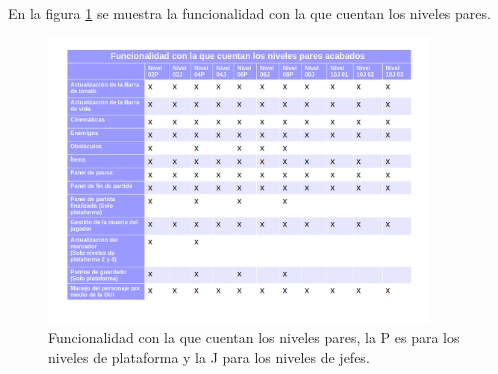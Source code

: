 En la figura \ref{fig:NivelesPares} se muestra la funcionalidad con la que cuentan los niveles pares.
		
		\begin{figure}[h]
    			\centering
    			\includegraphics[width=0.9\textwidth]{04ResultadosObetnidos/imagenes/funcionalidadPares.png}
    			\caption{Funcionalidad con la que cuentan los niveles pares, la P es 
    			para los niveles de plataforma y la J para los niveles de jefes.}
    			\label{fig:NivelesPares}
		\end{figure}
